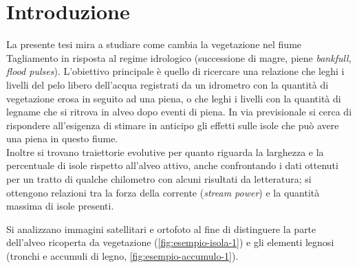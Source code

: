 \section{Introduzione}
La presente tesi mira a studiare come cambia la vegetazione nel fiume Tagliamento in risposta al regime idrologico (successione di magre, piene \emph{bankfull}, \emph{flood pulses}).
L'obiettivo principale è quello di ricercare una relazione che leghi i livelli del pelo libero dell'acqua registrati da un idrometro con la quantità di vegetazione erosa in seguito ad una piena, o che leghi i livelli con la quantità di legname che si ritrova in alveo dopo eventi di piena.
In via previsionale si cerca di rispondere all'esigenza di stimare in anticipo gli effetti sulle isole che può avere una piena in questo fiume.
\\
Inoltre si trovano traiettorie evolutive per quanto riguarda la larghezza e la percentuale di isole rispetto all'alveo attivo, anche confrontando i dati ottenuti per un tratto di qualche chilometro con alcuni risultati da letteratura; si ottengono relazioni tra la forza della corrente (\emph{stream power}) e la quantità massima di isole presenti.

Si analizzano immagini satellitari e ortofoto al fine di distinguere la parte dell'alveo ricoperta da vegetazione (\vref{fig:esempio-isola-1}) e gli elementi legnosi (tronchi e accumuli di legno, \vref{fig:esempio-accumulo-1}).

